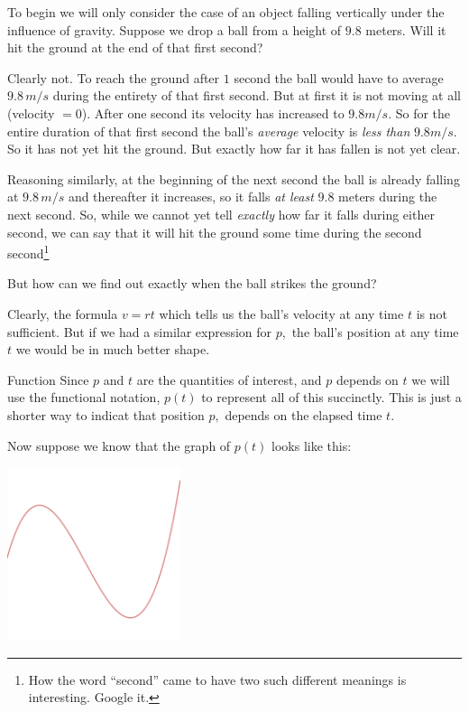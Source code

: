 To begin we will only consider the case of an object falling
vertically under the influence of gravity.  Suppose we drop a ball
from a height of $9.8$ meters. Will it hit the ground at the end of
that first second?

Clearly not. To reach the ground after $1$ second the ball would have
to average $9.8\,m/s$  during the entirety of that first second.  But at
first it is not moving at all (velocity $=0$). After one second its
velocity has increased to $9.8 m/s.$ So for the entire duration of
that first second the ball's \emph{average} velocity is \emph{less
  than} $9.8 m/s.$ So it has not yet hit the ground. But exactly how
far it has fallen is not yet clear.

Reasoning similarly, at the beginning of the next second the ball is
already falling at $9.8\,m/s$  and thereafter it increases, so it falls
\emph{at least} $9.8$ meters during the next second. So, while we
cannot yet tell \emph{exactly} how far it falls during either second,
we can say that it will hit the ground some time during the second
second\footnote{How the word ``second'' came to have two such
  different meanings is interesting. Google it.}

But how can we find out exactly when the ball strikes the ground?

Clearly, the formula $v=rt$ which tells us the ball's velocity at any
time $t$ is not sufficient.  But if we had a similar expression for
$p,$ the ball's position at any time $t$ we would be in much better
shape. 

\begin{mynotation}{Function}
  Since $p$ and $t$ are the quantities of interest, and $p$ depends on
  $t$ we will use the functional notation, $p(t)$ to represent all of
  this succinctly.  This is just a shorter way to indicat that
  position $p,$ depends on the elapsed time $t.$
\end{mynotation}
Now suppose we know that the graph of $p(t)$ looks like this:

\centerline{\includegraphics*[height=2in,width=2in]{Figures/GenericVelocity}}


